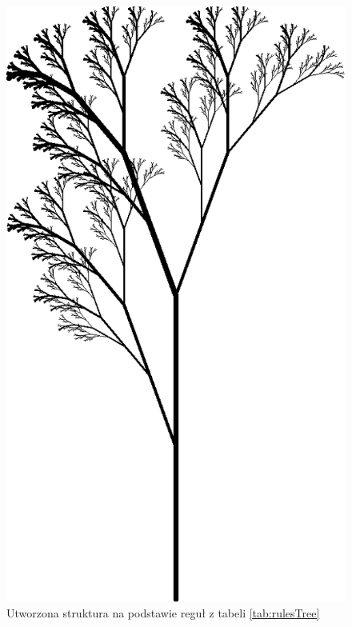 \documentclass[a4paper,12pt,twoside]{book} %
\begin{document}
\begin{figure}[H]
	\centering
	\includegraphics[scale=0.8]{grafika/treeExample}
	\caption{Utworzona struktura na podstawie reguł z tabeli \ref{tab:rulesTree}}
	\label{fig:treeExample}
\end{figure}


\end{document}
